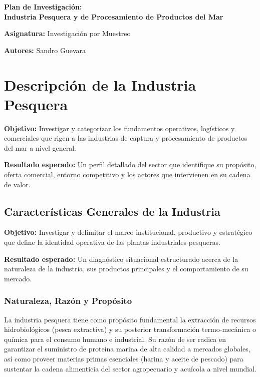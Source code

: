 \documentclass[11pt,a4paper]{article}
\newcommand{\objetivo}[1]{\noindent\textbf{\textcolor{blue!60!black}{Objetivo:}} #1\par\vspace{0.1cm}}
\newcommand{\resultado}[1]{\noindent\textbf{\textcolor{green!50!black}{Resultado esperado:}} #1\par\vspace{0.4cm}}
\begin{document}
\begin{titlepage}
    \centering
    \vspace*{3cm}
    {\Huge \textbf{Plan de Investigación: \\ Industria Pesquera y de Procesamiento de Productos del Mar} \par}
    \vspace{1.5cm}
    {\Large \textbf{Asignatura:} Investigación por Muestreo \par}
    \vspace{0.5cm}
    {\Large \textbf{Autores:} Sandro Guevara \par}
    \vspace{2.5cm}
  
    \vfill
\end{titlepage}

\tableofcontents
\newpage

\section{Descripción de la Industria Pesquera}
\objetivo{Investigar y categorizar los fundamentos operativos, logísticos y comerciales que rigen a las industrias de captura y procesamiento de productos del mar a nivel general.}
\resultado{Un perfil detallado del sector que identifique su propósito, oferta comercial, entorno competitivo y los actores que intervienen en su cadena de valor.}

\subsection{Características Generales de la Industria}
\objetivo{Investigar y delimitar el marco institucional, productivo y estratégico que define la identidad operativa de las plantas industriales pesqueras.}
\resultado{Un diagnóstico situacional estructurado acerca de la naturaleza de la industria, sus productos principales y el comportamiento de su mercado.}

\subsubsection{Naturaleza, Razón y Propósito}
La industria pesquera tiene como propósito fundamental la extracción de recursos hidrobiológicos (pesca extractiva) y su posterior transformación termo-mecánica o química para el consumo humano e industrial. Su razón de ser radica en garantizar el suministro de proteína marina de alta calidad a mercados globales, así como proveer materias primas esenciales (harina y aceite de pescado) para sustentar la cadena alimenticia del sector agropecuario y acuícola a nivel mundial.
\end{document}
